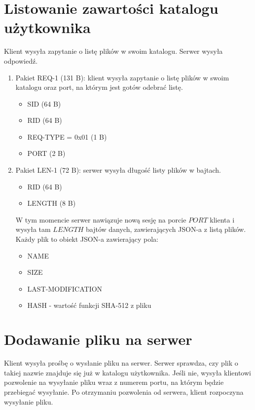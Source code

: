 \documentclass{article}
\begin{document}
	\section{Listowanie zawartości katalogu użytkownika}
	Klient wysyła zapytanie o listę plików w swoim katalogu. Serwer wysyła odpowiedź. 
	
	\begin{enumerate}
		\item Pakiet REQ-1 \label{REQ-1} (131 B): klient wysyła zapytanie o listę plików w swoim katalogu oraz port, na którym jest gotów odebrać listę. 
		\begin{itemize}
			\item SID (64 B)
			\item RID (64 B)
			\item REQ-TYPE = 0x01 (1 B)
			\item PORT (2 B)
		\end{itemize}
	
		\item Pakiet LEN-1 \label{LEN-1} (72 B): serwer wysyła długość listy plików w bajtach. 
		\begin{itemize}
			\item RID (64 B)
			\item LENGTH (8 B)
		\end{itemize}
	
		W tym momencie serwer nawiązuje nową sesję na porcie $PORT$ klienta i wysyła tam $LENGTH$ bajtów danych, zawierających JSON-a z listą plików. Każdy plik to obiekt JSON-a zawierający pola:
		\begin{itemize}
			\item NAME
			\item SIZE
			\item LAST-MODIFICATION
			\item HASH - wartość funkcji SHA-512 z pliku
		\end{itemize}
		
	\end{enumerate}

	\section{Dodawanie pliku na serwer}
	Klient wysyła prośbę o wysłanie pliku na serwer. Serwer sprawdza, czy plik o takiej nazwie znajduje się już w katalogu użytkownika. Jeśli nie, wysyła klientowi pozwolenie na wysyłanie pliku wraz z numerem portu, na którym będzie przebiegać wysyłanie. Po otrzymaniu pozwolenia od serwera, klient rozpoczyna wysyłanie pliku. 
	
\end{document}
